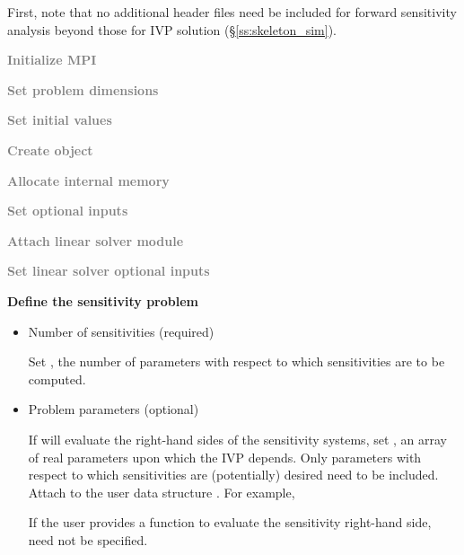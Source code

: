 First, note that no additional header files need be included for forward sensitivity 
analysis beyond those for IVP solution (\S\ref{ss:skeleton_sim}).
\begin{Steps}
  
\item 
  \textcolor{gray}{\bf {\p} Initialize MPI}

\item
  \textcolor{gray}{\bf Set problem dimensions}

\item
  \textcolor{gray}{\bf Set initial values}
 
\item
  \textcolor{gray}{\bf Create {\cvodes} object}

\item
  \textcolor{gray}{\bf Allocate internal memory}

\item
  \textcolor{gray}{\bf Set optional inputs}

\item
  \textcolor{gray}{\bf Attach linear solver module}

\item
  \textcolor{gray}{\bf Set linear solver optional inputs}

\item \label{i:fwd_start}
  {\bf Define the sensitivity problem}

  \begin{itemize}

    \item Number of sensitivities (required)

      Set , the number of parameters with respect to which sensitivities
      are to be computed.
  
    \item Problem parameters (optional)

      If {\cvodes} will evaluate the right-hand sides of the sensitivity 
      systems, set , an array of  real parameters upon which the IVP 
      depends. Only parameters with respect to which sensitivities are (potentially) 
      desired need to be included. 
      Attach  to the user data structure . 
      For example, 

      If the user provides a function to evaluate the sensitivity right-hand side,
       need not be specified.


\end{itemize}
\end{Steps}
